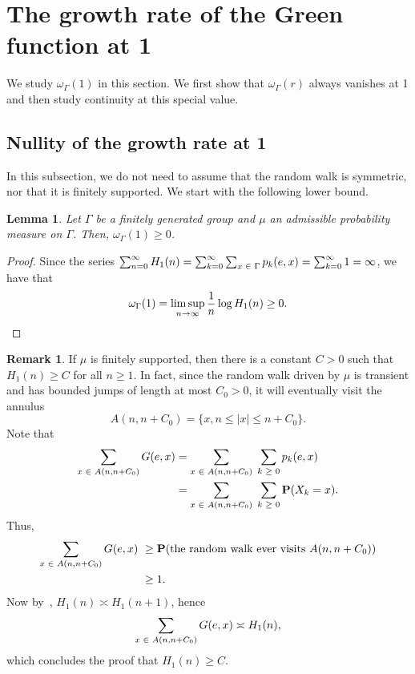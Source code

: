\documentclass[10pt]{amsart}
\newtheorem{lemm}[theo]{Lemma}\newtheorem{prop}[theo]{Proposition}\newtheorem{coro}[theo]{Corollary}\newtheorem{conj}[theo]{Conjecture}
\theoremstyle{definition}\newtheorem{defi}[theo]{Definition}\newtheorem{rema}[theo]{Remark}\newtheorem{exam}[theo]{Example}\newtheorem{exem}[theo]{Example}\newtheorem{nota}[theo]{Notation}
\newcommand{\bfP}{\mathbf{P}}
\let\oldin\in
\renewcommand{\in}{\mathchoice{\oldin}{\oldin}{\,\oldin\,}{\,\oldin\,}}
\let\oldge\ge
\renewcommand{\ge}{\mathchoice{\oldge}{\oldge}{\,\oldge\,}{\,\oldge\,}}
\renewcommand*{\to}{\mathchoice{\longrightarrow}{\rightarrow}{\rightarrow}{\rightarrow}}
\newcommand*{\MK}{\mkern 2mu}
\begin{document}
\section{The growth rate of the Green function at 1}
\label{Sectiongrowthrateat1}
We study $\omega_\Gamma(1)$ in this section. We first show that $\omega_\Gamma(r)$ always vanishes at 1 and then study continuity at this special value.



\subsection{Nullity of the growth rate at 1}

In this subsection, we do not need to assume that the random walk is symmetric, nor that it is finitely supported. We start with the following lower bound.

\begin{lemm}\label{lowerboundgrowthrateat1}
Let $\Gamma$ be a finitely generated group and $\mu$ an admissible probability measure on $\Gamma$. Then, $\omega_\Gamma(1)\geq 0$.
\end{lemm}

\begin{proof}
Since the series $\sum_{n = 0}^{\infty} H_1(n) = \sum_{k=0}^{\infty} \sum_{x \in \Gamma} p_k(e, x) = \sum_{k=0}^{\infty} 1 = \infty$, we have that
\begin{equation*}
\omega_{\Gamma}(1) = \limsup_{n \to \infty} \frac{1}{n} \log H_1(n) \geq 0. \qedhere
\end{equation*}
\end{proof}


\begin{rema}
If $\mu$ is finitely supported, then there is a constant $C > 0$ such that $H_1(n) \geq C$ for all $n \geq 1$. In fact, since the random walk driven by {$\mu$ is transient} and has bounded jumps of length at most $C_0>0$, it will eventually visit the annulus
\[
A(n,n+C_0)=\{x,n\leq |x|\leq n+C_0\}.
\]
Note that
\begin{align*}
\sum_{x\in A(n,n+C_0)}G(e,x) &= \sum_{x\in A(n,n+C_0)}\;\sum_{k\ge 0}p_k(e,x)\\
&=\sum_{x\in A(n,n+C_0)}\;\sum_{k\ge 0}\bfP(X_k=x).
\end{align*}
Thus,
\begin{align*}
\sum_{x\in A(n,n+C_0)}G(e,x) & \ \geq \bfP(\text{the random walk ever visits }A(n,n+C_0)) \\
&\ \geq 1.
\end{align*}
Now by~\cite[Lemma~3.1$\MK$(1)]{DWY}, $H_1(n)\asymp H_1(n+1)$, hence
\[
\sum_{x\in A(n,n+C_0)}G(e,x)\asymp H_1(n),
\]
which concludes the proof that $H_1(n) \geq C$.
\end{rema}
\end{document}
